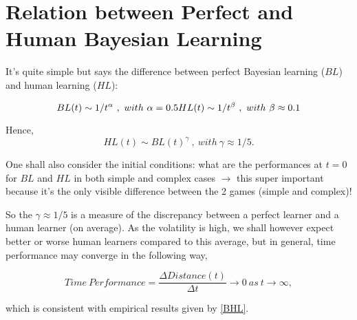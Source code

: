 \section{Relation between Perfect and Human Bayesian Learning}
It's quite simple but says the difference between perfect Bayesian learning ($BL$) and human learning ($HL$):

\begin{equation}
BL(t) \sim 1/t^{\alpha}~,~with~\alpha = 0.5\\
HL(t) \sim 1/t^{\beta}~,~with~\beta \approx 0.1\\
\label{BHL}
\end{equation}
 
Hence, 
\begin{equation}
HL(t) \sim BL(t)^{\gamma}~,~with~\gamma \approx 1/5.
\end{equation}

One shall also consider the initial conditions: what are the performances at $t=0$ for $BL$ and $HL$ in both simple and complex cases $\rightarrow$ this super important because it's the only visible difference between the 2 games (simple and complex)!

So the $\gamma \approx 1/5$ is a measure of the discrepancy between a perfect learner and a human learner (on average). As the volatility is high, we shall however expect better or worse human learners compared to this average, but in general, time performance may converge in the following way,

\begin{equation}
Time~Performance = \frac{\Delta Distance(t)}{\Delta t} \rightarrow 0~as~t\rightarrow \infty,
\end{equation}

which is consistent with empirical results given by \ref{BHL}.


  
  
  
  
  